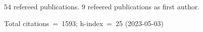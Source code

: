 54 refereed publications. 9 refeered publications as first author.

Total citations~=~1593; h-index~=~25 (2023-05-03)